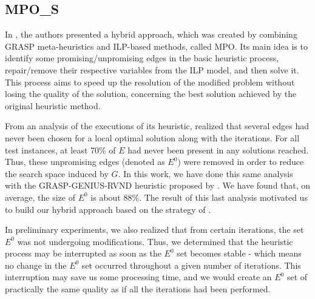 \documentclass{singlecol-new}
\theoremstyle{TH}{
\newtheorem{lemma}{Lemma}
\newtheorem{theorem}[lemma]{Theorem}
\newtheorem{corrolary}[lemma]{Corrolary}
\newtheorem{conjecture}[lemma]{Conjecture}
\newtheorem{proposition}[lemma]{Proposition}
\newtheorem{claim}[lemma]{Claim}
\newtheorem{stheorem}[lemma]{Wrong Theorem}
}
\theoremstyle{THrm}{
\newtheorem{definition}{Definition}[section]
\newtheorem{question}{Question}[section]
\newtheorem{remark}{Remark}
\newtheorem{scheme}{Scheme}
}
\theoremstyle{THhit}{
\newtheorem{case}{Case}[section]
}
\begin{document}
\subsection{MPO\_S}



In \citet{climaco2018}, the authors presented a hybrid approach, which was created by combining GRASP meta-heuristics and ILP-based methods, called MPO. Its main idea is to identify some promising/unpromising edges in the basic heuristic process, repair/remove their respective variables from the ILP model, and then solve it. This process aims to speed up the resolution of the modified problem without losing the quality of the solution, concerning the best solution achieved by the original heuristic method.


From an analysis of the exe\-cu\-tions of its heuristic, \citet{climaco2018} realized that several edges had never been chosen for a local optimal solution along with the iterations. For all test instances, at least 70\% of $E$ had never been present in any solutions reached. Thus, these unpromising edges (denoted as $E^0$) were removed in order to reduce the search space induced by $G$. In this work, we have done this same analysis with the GRASP-GENIUS-RVND heuristic proposed by \citet{daSilva}. We have found that, on average, the size of $E^0$ is about 88\%. The result of this last analysis motivated us to build our hybrid approach based on the strategy of \citet{climaco2018}.

In preliminary experiments, we also realized that from certain iterations, the set $E^0$ was not undergoing modifications. Thus, we determined that the heuristic process may be interrupted as soon as the $E^0$ set becomes stable - which means no change in the $E^0$ set occurred throughout a given number of iterations. This interruption may save us some processing time, and we would create an $E^0$ set of practically the same quality as if all the iterations had been performed.
                                          
\end{document}
